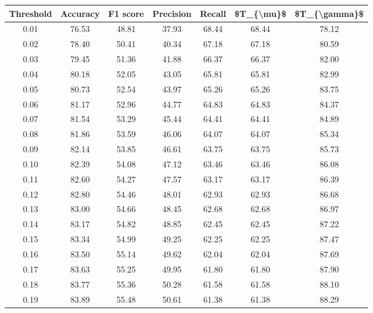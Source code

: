 \begin{tabular}{|c|c|c|c|c|c|c|}
\hline
 Threshold &  Accuracy &  F1 score &  Precision &  Recall &  \$T\_\{\textbackslash mu\}\$ &  \$T\_\{\textbackslash gamma\}\$ \\
\hline
      0.01 &     76.53 &     48.81 &      37.93 &   68.44 &      68.44 &         78.12 \\
      0.02 &     78.40 &     50.41 &      40.34 &   67.18 &      67.18 &         80.59 \\
      0.03 &     79.45 &     51.36 &      41.88 &   66.37 &      66.37 &         82.00 \\
      0.04 &     80.18 &     52.05 &      43.05 &   65.81 &      65.81 &         82.99 \\
      0.05 &     80.73 &     52.54 &      43.97 &   65.26 &      65.26 &         83.75 \\
      0.06 &     81.17 &     52.96 &      44.77 &   64.83 &      64.83 &         84.37 \\
      0.07 &     81.54 &     53.29 &      45.44 &   64.41 &      64.41 &         84.89 \\
      0.08 &     81.86 &     53.59 &      46.06 &   64.07 &      64.07 &         85.34 \\
      0.09 &     82.14 &     53.85 &      46.61 &   63.75 &      63.75 &         85.73 \\
      0.10 &     82.39 &     54.08 &      47.12 &   63.46 &      63.46 &         86.08 \\
      0.11 &     82.60 &     54.27 &      47.57 &   63.17 &      63.17 &         86.39 \\
      0.12 &     82.80 &     54.46 &      48.01 &   62.93 &      62.93 &         86.68 \\
      0.13 &     83.00 &     54.66 &      48.45 &   62.68 &      62.68 &         86.97 \\
      0.14 &     83.17 &     54.82 &      48.85 &   62.45 &      62.45 &         87.22 \\
      0.15 &     83.34 &     54.99 &      49.25 &   62.25 &      62.25 &         87.47 \\
      0.16 &     83.50 &     55.14 &      49.62 &   62.04 &      62.04 &         87.69 \\
      0.17 &     83.63 &     55.25 &      49.95 &   61.80 &      61.80 &         87.90 \\
      0.18 &     83.77 &     55.36 &      50.28 &   61.58 &      61.58 &         88.10 \\
      0.19 &     83.89 &     55.48 &      50.61 &   61.38 &      61.38 &         88.29 \\

\end{tabular}
